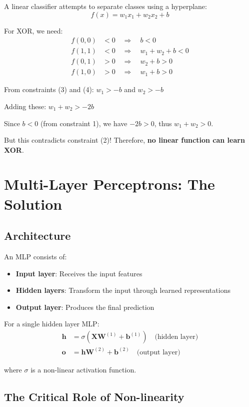 \documentclass{article}
\begin{document}
A linear classifier attempts to separate classes using a hyperplane:
\[f(x) = w_1x_1 + w_2x_2 + b\]

For XOR, we need:
\begin{align}
f(0,0) &< 0 \quad \Rightarrow \quad b < 0 \\
f(1,1) &< 0 \quad \Rightarrow \quad w_1 + w_2 + b < 0 \\
f(0,1) &> 0 \quad \Rightarrow \quad w_2 + b > 0 \\
f(1,0) &> 0 \quad \Rightarrow \quad w_1 + b > 0
\end{align}

From constraints (3) and (4): $w_1 > -b$ and $w_2 > -b$

Adding these: $w_1 + w_2 > -2b$

Since $b < 0$ (from constraint 1), we have $-2b > 0$, thus $w_1 + w_2 > 0$.

But this contradicts constraint (2)! Therefore, \textbf{no linear function can learn XOR}.

\section{Multi-Layer Perceptrons: The Solution}

\subsection{Architecture}

An MLP consists of:
\begin{itemize}
    \item \textbf{Input layer}: Receives the input features
    \item \textbf{Hidden layers}: Transform the input through learned representations
    \item \textbf{Output layer}: Produces the final prediction
\end{itemize}

For a single hidden layer MLP:
\begin{align}
\mathbf{h} &= \sigma(\mathbf{X}\mathbf{W}^{(1)} + \mathbf{b}^{(1)}) \quad \text{(hidden layer)} \\
\mathbf{o} &= \mathbf{h}\mathbf{W}^{(2)} + \mathbf{b}^{(2)} \quad \text{(output layer)}
\end{align}

where $\sigma$ is a non-linear activation function.

\subsection{The Critical Role of Non-linearity}
\end{document}
